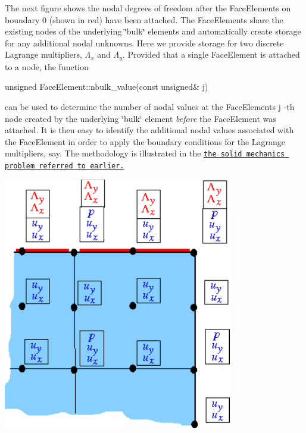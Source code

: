 The next figure shows the nodal degrees of freedom after the {\ttfamily Face\+Elements} on boundary 0 (shown in red) have been attached. The {\ttfamily Face\+Elements} share the existing nodes of the underlying \char`\"{}bulk\char`\"{} elements and automatically create storage for any additional nodal unknowns. Here we provide storage for two discrete Lagrange multipliers, $ \Lambda_x $ and $ \Lambda_y. $ Provided that a single {\ttfamily Face\+Element} is attached to a node, the function 
\begin{DoxyCode}
\textcolor{keywordtype}{unsigned} FaceElement::nbulk\_value(\textcolor{keyword}{const} \textcolor{keywordtype}{unsigned}& j)
\end{DoxyCode}
 can be used to determine the number of nodal values at the {\ttfamily Face\+Element\textquotesingle{}s} {\ttfamily j} -\/th node created by the underlying \char`\"{}bulk\char`\"{} element {\itshape before} the {\ttfamily Face\+Element} was attached. It is then easy to identify the additional nodal values associated with the {\ttfamily Face\+Element} in order to apply the boundary conditions for the Lagrange multipliers, say. The methodology is illustrated in the \href{../../../solid/prescribed_displ_lagr_mult/html/index.html#bcs_for_lagrange_multipliers}{\tt the solid mechanics problem referred to earlier.}

 
\begin{DoxyImage}
\includegraphics[width=0.75\textwidth]{multiple_face_elements2}
\end{DoxyImage}


